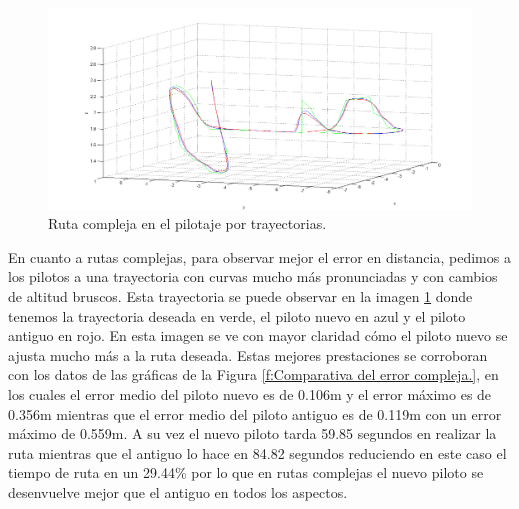 \begin{figure}[H]
	\begin{center}
		\includegraphics[width=1\textwidth]{imag/IMG41.png}
				\caption{Ruta compleja en el pilotaje por trayectorias.}
		\label{fig:Ruta compleja en trayectoria.}	
	\end{center}
\end{figure}

\hspace{1cm} En cuanto a rutas complejas, para observar mejor el error en distancia, pedimos a los pilotos a una trayectoria con curvas mucho más pronunciadas y con cambios de altitud bruscos. Esta trayectoria se puede observar en la imagen \ref{fig:Ruta compleja en trayectoria.} donde tenemos la trayectoria deseada en verde, el piloto nuevo en azul y el piloto antiguo en rojo. En esta imagen se ve con mayor claridad cómo el piloto nuevo se ajusta mucho más a la ruta deseada. Estas mejores prestaciones se corroboran con los datos de las gráficas de la Figura \ref{f:Comparativa del error compleja.}, en los cuales el error medio del piloto nuevo es de 0.106m y el error máximo es de 0.356m mientras que el error medio del piloto antiguo es de 0.119m con un error máximo de 0.559m. A su vez el nuevo piloto tarda 59.85 segundos en realizar la ruta mientras que el antiguo lo hace en 84.82 segundos reduciendo en este caso el tiempo de ruta en un 29.44\% por lo que en rutas complejas el nuevo piloto se desenvuelve mejor que el antiguo en todos los aspectos.

